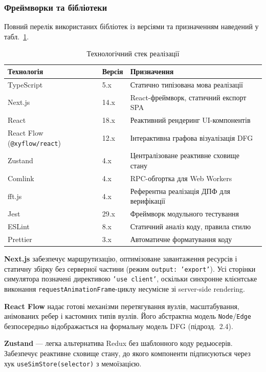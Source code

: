 \subsubsection*{Фреймворки та бібліотеки}

Повний перелік використаних бібліотек із версіями та призначенням
наведений у табл.~\ref{tab:tech_stack}.

\begin{table}[H]
  \caption{Технологічний стек реалізації}
  \label{tab:tech_stack}
  \centering
  \small
  \begin{tabular}{p{3.2cm}p{1.6cm}p{8.2cm}}
    \toprule
    Технологія & Версія & Призначення \\
    \midrule
    TypeScript & 5.x & Статично типізована мова реалізації \\
    Next.js & 14.x & React-фреймворк, статичний експорт SPA \\
    React & 18.x & Реактивний рендеринг UI-компонентів \\
    React Flow (\texttt{@xyflow/react}) & 12.x & Інтерактивна графова візуалізація DFG \\
    Zustand & 4.x & Централізоване реактивне сховище стану \\
    Comlink & 4.x & RPC-обгортка для Web Workers \\
    fft.js & 4.x & Референтна реалізація ДПФ для верифікації \\
    Jest & 29.x & Фреймворк модульного тестування \\
    ESLint & 8.x & Статичний аналіз коду, правила стилю \\
    Prettier & 3.x & Автоматичне форматування коду \\
    \bottomrule
  \end{tabular}
\end{table}

\textbf{Next.js} забезпечує маршрутизацію, оптимізоване завантаження
ресурсів і статичну збірку без серверної частини (режим
\texttt{output: 'export'}). Усі сторінки симулятора позначені
директивою \texttt{'use client'}, оскільки синхронне клієнтське
виконання \texttt{requestAnimationFrame}-циклу несумісне зі
server-side rendering.

\textbf{React Flow} надає готові механізми перетягування вузлів,
масштабування, анімованих ребер і кастомних типів вузлів. Його
абстрактна модель \texttt{Node}/\texttt{Edge} безпосередньо
відображається на формальну модель DFG (підрозд.~2.4).

\textbf{Zustand} --- легка альтернатива Redux без шаблонного коду
редьюсерів. Забезпечує реактивне сховище стану, до якого компоненти
підписуються через хук \texttt{useSimStore(selector)} з мемоїзацією.

